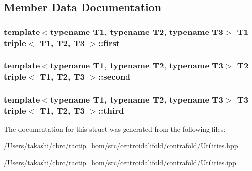 \subsection{Member Data Documentation}
\hypertarget{structtriple_a6aa8508e6e6f859dda04f144f361c0d2}{
\subsubsection[{first}]{\setlength{\rightskip}{0pt plus 5cm}template$<$typename T1, typename T2, typename T3$>$ T1 {\bf triple}$<$ T1, T2, T3 $>$\+::first}}\label{structtriple_a6aa8508e6e6f859dda04f144f361c0d2}
\hypertarget{structtriple_a41050194c8c7984707c7ad13c96e8631}{
\subsubsection[{second}]{\setlength{\rightskip}{0pt plus 5cm}template$<$typename T1, typename T2, typename T3$>$ T2 {\bf triple}$<$ T1, T2, T3 $>$\+::second}}\label{structtriple_a41050194c8c7984707c7ad13c96e8631}
\hypertarget{structtriple_a5675f08ea7996033edbcf7074404cdd8}{
\subsubsection[{third}]{\setlength{\rightskip}{0pt plus 5cm}template$<$typename T1, typename T2, typename T3$>$ T3 {\bf triple}$<$ T1, T2, T3 $>$\+::third}}\label{structtriple_a5675f08ea7996033edbcf7074404cdd8}


The documentation for this struct was generated from the following files\+:\begin{DoxyCompactItemize}
\item 
/\+Users/takashi/cbrc/ractip\+\_\+hom/src/centroidalifold/contrafold/\hyperlink{centroidalifold_2contrafold_2_utilities_8hpp}{Utilities.\+hpp}\item 
/\+Users/takashi/cbrc/ractip\+\_\+hom/src/centroidalifold/contrafold/\hyperlink{centroidalifold_2contrafold_2_utilities_8ipp}{Utilities.\+ipp}\end{DoxyCompactItemize}
